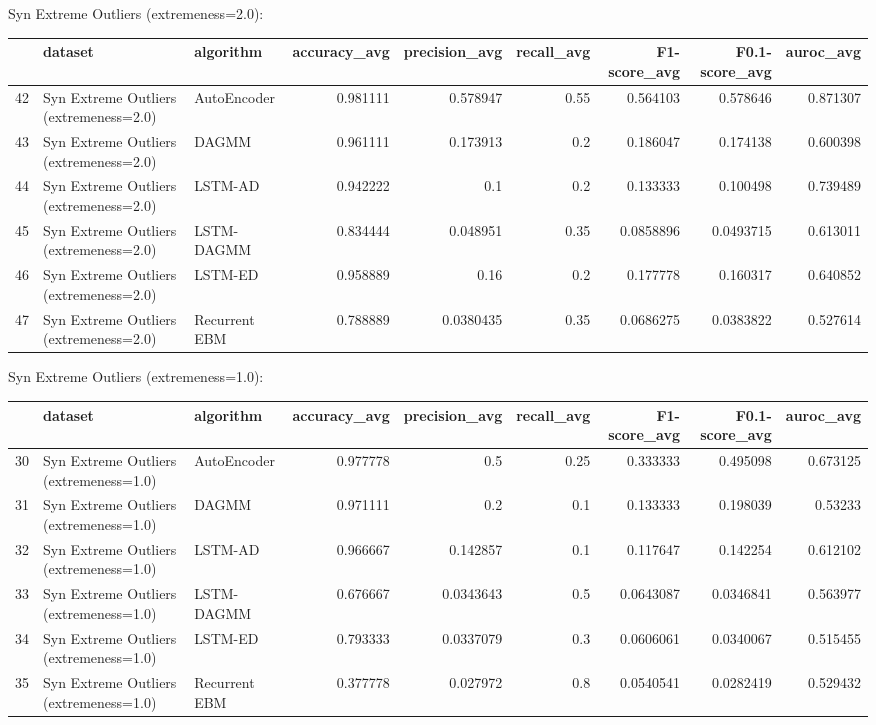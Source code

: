 Syn Extreme Outliers (extremeness=2.0):

\begin{tabular}{rllrrrrrr}
\hline
    & dataset                                & algorithm     &   accuracy\_avg &   precision\_avg &   recall\_avg &   F1-score\_avg &   F0.1-score\_avg &   auroc\_avg \\
\hline
 42 & Syn Extreme Outliers (extremeness=2.0) & AutoEncoder   &       0.981111 &       0.578947  &         0.55 &      0.564103  &        0.578646  &    0.871307 \\
 43 & Syn Extreme Outliers (extremeness=2.0) & DAGMM         &       0.961111 &       0.173913  &         0.2  &      0.186047  &        0.174138  &    0.600398 \\
 44 & Syn Extreme Outliers (extremeness=2.0) & LSTM-AD       &       0.942222 &       0.1       &         0.2  &      0.133333  &        0.100498  &    0.739489 \\
 45 & Syn Extreme Outliers (extremeness=2.0) & LSTM-DAGMM    &       0.834444 &       0.048951  &         0.35 &      0.0858896 &        0.0493715 &    0.613011 \\
 46 & Syn Extreme Outliers (extremeness=2.0) & LSTM-ED       &       0.958889 &       0.16      &         0.2  &      0.177778  &        0.160317  &    0.640852 \\
 47 & Syn Extreme Outliers (extremeness=2.0) & Recurrent EBM &       0.788889 &       0.0380435 &         0.35 &      0.0686275 &        0.0383822 &    0.527614 \\
\hline
\end{tabular}

Syn Extreme Outliers (extremeness=1.0):

\begin{tabular}{rllrrrrrr}
\hline
    & dataset                                & algorithm     &   accuracy\_avg &   precision\_avg &   recall\_avg &   F1-score\_avg &   F0.1-score\_avg &   auroc\_avg \\
\hline
 30 & Syn Extreme Outliers (extremeness=1.0) & AutoEncoder   &       0.977778 &       0.5       &         0.25 &      0.333333  &        0.495098  &    0.673125 \\
 31 & Syn Extreme Outliers (extremeness=1.0) & DAGMM         &       0.971111 &       0.2       &         0.1  &      0.133333  &        0.198039  &    0.53233  \\
 32 & Syn Extreme Outliers (extremeness=1.0) & LSTM-AD       &       0.966667 &       0.142857  &         0.1  &      0.117647  &        0.142254  &    0.612102 \\
 33 & Syn Extreme Outliers (extremeness=1.0) & LSTM-DAGMM    &       0.676667 &       0.0343643 &         0.5  &      0.0643087 &        0.0346841 &    0.563977 \\
 34 & Syn Extreme Outliers (extremeness=1.0) & LSTM-ED       &       0.793333 &       0.0337079 &         0.3  &      0.0606061 &        0.0340067 &    0.515455 \\
 35 & Syn Extreme Outliers (extremeness=1.0) & Recurrent EBM &       0.377778 &       0.027972  &         0.8  &      0.0540541 &        0.0282419 &    0.529432 \\
\hline
\end{tabular}

